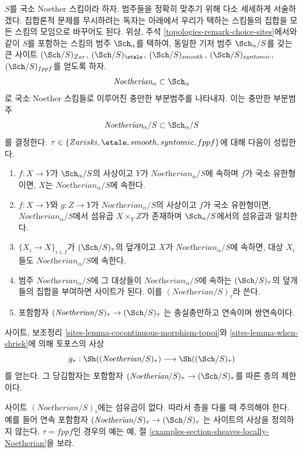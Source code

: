\medskip\noindent
$S$를 국소 Noether 스킴이라 하자. 범주들을 정확히 맞추기 위해 다소
세세하게 서술하겠다. 집합론적 문제를 무시하려는 독자는 아래에서 우리가
택하는 스킴들의 집합을 모든 스킴의 모임으로 바꾸어도 된다.
위상, 주석 \ref{topologies-remark-choice-sites}에서와 같이
$S$를 포함하는 스킴의 범주 $\Sch_\alpha$를 택하여,
동일한 기저 범주 $\Sch_\alpha/S$를 갖는 큰 사이트 $(\Sch/S)_{Zar}$,
$(\Sch/S)_\etale$, $(\Sch/S)_{smooth}$, $(\Sch/S)_{syntomic}$,
$(\Sch/S)_{fppf}$를 얻도록 하자.
$$ 
\textit{Noetherian}_\alpha \subset \Sch_\alpha
$$
로 국소 Noether 스킴들로 이루어진 충만한 부분범주를 나타내자.
이는 충만한 부분범주
$$ 
\textit{Noetherian}_\alpha/S \subset \Sch_\alpha/S
$$
를 결정한다. $\tau \in \{Zariski, \etale, smooth, syntomic, fppf\}$에 대해
다음이 성립한다.
\begin{enumerate}
\item $f : X \to Y$가 $\Sch_\alpha/S$의 사상이고
$Y$가 $\textit{Noetherian}_\alpha/S$에 속하며 $f$가 국소 유한형이면,
$X$는 $\textit{Noetherian}_\alpha/S$에 속한다.
\item $f : X \to Y$와 $g : Z \to Y$가
$\textit{Noetherian}_\alpha/S$의 사상이고 $f$가 국소 유한형이면,
$\textit{Noetherian}_\alpha/S$에서 섬유곱 $X \times_Y Z$가 존재하며
$\Sch_\alpha/S$에서의 섬유곱과 일치한다.
\item $\{X_i \to X\}_{i \in I}$가 $(\Sch/S)_\tau$의 덮개이고
$X$가 $\textit{Noetherian}_\alpha/S$에 속하면,
대상 $X_i$들도 $\textit{Noetherian}_\alpha/S$에 속한다.
\item 범주 $\textit{Noetherian}_\alpha/S$에
그 대상들이 $\textit{Noetherian}_\alpha/S$에 속하는
$(\Sch/S)_\tau$의 덮개들의 집합을 부여하면 사이트가 된다.
이를 $(\textit{Noetherian}/S)_\tau$라 쓴다.
\item 포함함자
$(\textit{Noetherian}/S)_\tau \to (\Sch/S)_\tau$
는 충실충만하고 연속이며 쌍연속이다.
\end{enumerate}
사이트, 보조정리 \ref{sites-lemma-cocontinuous-morphism-topoi}와
\ref{sites-lemma-when-shriek}에 의해 토포스의 사상
$$ 
g_\tau : \Sh((\textit{Noetherian}/S)_\tau) \longrightarrow \Sh((\Sch/S)_\tau)
$$
를 얻는다. 그 당김함자는 포함함자
$(\textit{Noetherian}/S)_\tau \to (\Sch/S)_\tau$를 따른 층의 제한이다.

\begin{remark}[주의]
\label{remark-no-fibre-products}
사이트 $(\textit{Noetherian}/S)_\tau$에는 섬유곱이 없다.
따라서 층을 다룰 때 주의해야 한다. 예를 들어 연속 포함함자
$(\textit{Noetherian}/S)_\tau \to (\Sch/S)_\tau$
는 사이트의 사상을 정의하지 않는다.
$\tau = fppf$인 경우의 예는 예, 절
\ref{examples-section-sheaves-locally-Noetherian}을 보라.
\end{remark}

